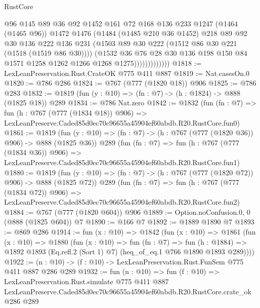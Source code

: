 \begin{lexlean}{RustCore}
\begin{coremodule}
                          @96
                          @145
                          @89
                          @36
                          @92
                          @1452
                          @161
                          @72
                          @168
                          @136
                          @233
                          @1247
                          (@1464 (@1465 @96))
                          @1472
                          @1476
                          (@1484
                            (@1485 @210 @36 @1452)
                            @218
                            @89
                            @92
                            @30
                            @136
                            @222
                            @136
                            @231
                            (@1503 @89 @30 @222 (@1512 @86 @30 @221 (@1518 (@1519 @86 @30))))
                            (@1532
                              @36
                              @76
                              @28
                              @30
                              @136
                              @198
                              @150
                              @84
                              @1571
                              @1258
                              @1262
                              @1266
                              @1268
                              @1275)))))))))))))
@1818 := LexLeanPreservation.Rust.CrateOK @775 @411 @887
@1819 := Nat.casesOn.{0}
@1820 := @786 @286
@1824 := @767 (@777 (@1820 @18)) @906
@1825 := @786 @283
@1832 := @1819 (fun (y : @10) => (fn : @7) -> (h : @1824) -> @888 (@1825 @18)) @289
@1834 := @786 Nat.zero
@1842 := @1832
    (fun (fn : @7) =>
    fun (h : @767 (@777 (@1834 @18)) @906) =>
    LexLeanPreserve.Caded85d0ec70c96655a45904ef60abdb.R20.RustCore.fun0)
@1861 := @1819
    (fun (y : @10) => (fn : @7) -> (h : @767 (@777 (@1820 @36)) @906) -> @888 (@1825 @36))
    @289
    (fun (fn : @7) =>
    fun (h : @767 (@777 (@1834 @36)) @906) =>
    LexLeanPreserve.Caded85d0ec70c96655a45904ef60abdb.R20.RustCore.fun1)
@1880 := @1819
    (fun (y : @10) => (fn : @7) -> (h : @767 (@777 (@1820 @72)) @906) -> @888 (@1825 @72))
    @289
    (fun (fn : @7) =>
    fun (h : @767 (@777 (@1834 @72)) @906) =>
    LexLeanPreserve.Caded85d0ec70c96655a45904ef60abdb.R20.RustCore.fun2)
@1884 := @767 (@777 (@1820 @604)) @906
@1889 := Option.noConfusion.{0, 0} (@888 (@1825 @604)) @7
@1890 := @166 @7
@1892 := @1889 @1890 @7
@1893 := @869 @286
@1914 := fun (x : @10) =>
  @1842
    (fun (x : @10) =>
    @1861
      (fun (x : @10) =>
      @1880
        (fun (x : @10) =>
        fun (fn : @7) =>
        fun (h : @1884) =>
        @1892 @1893 (Eq.refl.{2} (Sort 1) @7) (heq_of_eq.{1} @766 @1890 @1893 @289))))
@1922 := (n : @10) -> (f : @10) -> LexLeanPreservation.Rust.FunSem @775 @411 @887 @286 @289
@1932 := fun (n : @10) =>
  fun (f : @10) =>
  LexLeanPreservation.Rust.simulate
    @775
    @411
    @887
    LexLeanPreserve.Caded85d0ec70c96655a45904ef60abdb.R20.RustCore.crate_ok
    @286
    @289
\end{coremodule}
\end{lexlean}
